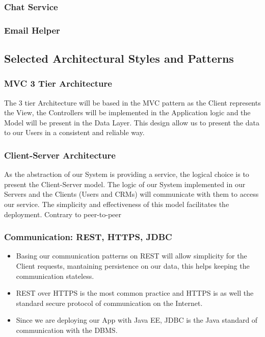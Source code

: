 \documentclass[a4paper]{article}
\begin{document}
\subsubsection{Chat Service}
\begin{figure}[h]
\centering
\vspace*{\fill}
\noindent{}
\vspace*{0.1cm}
\end{figure}

\subsubsection{Email Helper}
\begin{figure}[h]
\centering
\vspace*{\fill}
\noindent{}%
\vspace*{0.1cm}
\end{figure}

\subsection{Selected Architectural Styles and Patterns}
\subsubsection{MVC 3 Tier Architecture}
The 3 tier Architecture will be based in the MVC pattern as the Client represents the View, the Controllers will be implemented in the Application logic and the Model will be present in the Data Layer. This design allow us to present the data to our Users in a consistent and reliable way.
\subsubsection{Client-Server Architecture}
As the abstraction of our System is providing a service, the logical choice is to present the Client-Server model. The logic of our System implemented in our Servers and the Clients (Users and CRMs) will communicate with them to access our service. The simplicity and effectiveness of this model facilitates the deployment. Contrary to peer-to-peer 

\subsubsection{Communication: REST, HTTPS, JDBC}
\begin{itemize}
\item Basing our communication patterns on REST will allow simplicity for the Client requests, mantaining persistence on our data, this helps keeping the communication stateless. 
\item  REST over HTTPS is the most common practice and HTTPS is as well the standard secure protocol of communication on the Internet. 
\item Since we are deploying our App with Java EE, JDBC is the Java standard of communication with the DBMS.
\end{itemize}
\end{document}

